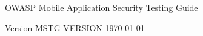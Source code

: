 \thispagestyle{empty} %

OWASP Mobile Application Security Testing Guide


Version {{MSTG-VERSION}} \today

